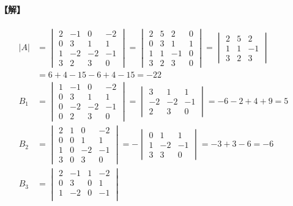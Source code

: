 \paragraph{【解】}
\begin{align*}
|A| &= \begin{vmatrix}
2 & -1 & 0 & -2 \\
0 & 3 & 1 & 1 \\
1 & -2 & -2 & -1 \\
3 & 2 & 3 & 0
\end{vmatrix} = \begin{vmatrix}
2 & 5 & 2 & 0 \\
0 & 3 & 1 & 1 \\
1 & 1 & -1 & 0 \\
3 & 2 & 3 & 0
\end{vmatrix} = \begin{vmatrix}
2 & 5 & 2 \\
1 & 1 & -1 \\
3 & 2 & 3
\end{vmatrix} \\
&= 6+4-15-6+4-15 = -22 \\
B_1 &= \begin{vmatrix}
1 & -1 & 0 & -2 \\
0 & 3 & 1 & 1 \\
0 & -2 & -2 & -1 \\
0 & 2 & 3 & 0
\end{vmatrix} = \begin{vmatrix}
3 & 1 & 1 \\
-2 & -2 & -1 \\
2 & 3 & 0
\end{vmatrix} = -6-2+4+9 = 5 \\
B_2 &= \begin{vmatrix}
2 & 1 & 0 & -2 \\
0 & 0 & 1 & 1 \\
1 & 0 & -2 & -1 \\
3 & 0 & 3 & 0
\end{vmatrix} = - \begin{vmatrix}
0 & 1 & 1 \\
1 & -2 & -1 \\
3 & 3 & 0
\end{vmatrix} = -3+3-6 = -6 \\
B_3 &= \begin{vmatrix}
2 & -1 & 1 & -2 \\
0 & 3 & 0 & 1 \\
1 & -2 & 0 & -1 \\

\end{vmatrix}
\end{align*}
